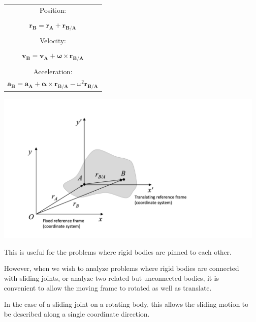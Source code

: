 \documentclass[12pt,letterpaper,twoside]{report}
\begin{document}
\begin{minipage}[c]{0.4\textwidth}
\begin{tabular}{  c  }
Position:  \\
  \\
$\bm{r_B} = \bm{r_A} +  \bm{r_{B/A}}$ \\
 \\
Velocity:  \\
 \\
$\bm{v_B} = \bm{v_A} + \bm{\omega} \times \bm{r_{B/A}}$ \\
\\
Acceleration: \\
$\bm{a_B} = \bm{a_A} + \bm{\alpha} \times \bm{r_{B/A}} - \omega^2   \bm{r_{B/A}}$\\
\end{tabular}
\label{tab:singlebest}
\end{minipage}%
\begin{minipage}[c]{0.65\textwidth}
\includegraphics[trim={1cm 1cm 7cm 2.5cm},clip,width=1\textwidth, center]{Slide5} 
\end{minipage}


This is useful for the problems where rigid bodies are pinned to each other.   

\vspace*{11\baselineskip}

However, when we wish to analyze problems where rigid bodies are connected with sliding joints, or analyze two related but unconnected bodies, it is convenient to allow the moving frame to rotated as well as translate.  

In the case of a sliding joint on a rotating body, this allows the sliding motion to be described along a single coordinate direction.  

\vspace*{11\baselineskip}
\end{document}
